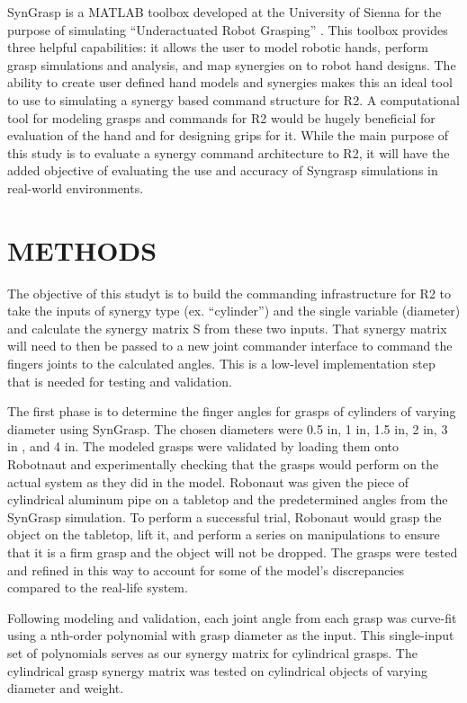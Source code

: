 \documentclass[letterpaper, 10 pt, conference]{ieeeconf}  %
\begin{document}
	SynGrasp is a MATLAB toolbox developed at the University of Sienna for the purpose of simulating “Underactuated Robot Grasping” \cite{salvetti_2016_synergies}.  This toolbox provides three helpful capabilities: it allows the user to model robotic hands, perform grasp simulations and analysis, and map synergies on to robot hand designs.   The ability to create user defined hand models and synergies makes this an ideal tool to use to simulating a synergy based command structure for R2.  A computational tool for modeling grasps and commands for R2 would be hugely beneficial for evaluation of the hand and for designing grips for it.  While the main purpose of this study is to evaluate a synergy command architecture to R2, it will have the added objective of evaluating the use and accuracy of Syngrasp simulations in real-world environments.


\section{METHODS}

	The objective of this studyt is to build the commanding infrastructure for R2 to take the inputs of synergy type (ex. “cylinder”) and the single variable (diameter) and calculate the synergy matrix S from these two inputs. That synergy matrix will need to then be passed to a new joint commander interface to command the fingers joints to the calculated angles. This is a low-level implementation step that is needed for testing and validation. 

The first phase is to determine the finger angles for grasps of cylinders of varying diameter using SynGrasp.  The chosen diameters were 0.5 in, 1 in, 1.5 in, 2 in, 3 in , and 4 in.  The modeled grasps were validated by loading them onto Robotnaut and experimentally checking that the grasps would perform on the actual system as they did in the model.  Robonaut was given the piece of cylindrical aluminum pipe on a tabletop and the predetermined angles from the SynGrasp simulation.  To perform a successful trial, Robonaut would grasp the object on the tabletop, lift it, and perform a series on manipulations to ensure that it is a firm grasp and the object will not be dropped.  The grasps were tested and refined in this way to account for some of the model's discrepancies compared to the real-life system.
	
Following modeling and validation, each joint angle from each grasp was curve-fit using a nth-order polynomial with grasp diameter as the input.  This single-input set of polynomials serves as our synergy matrix for cylindrical grasps.  The cylindrical grasp synergy matrix was tested on cylindrical  objects of varying diameter and weight. 
\end{document}
